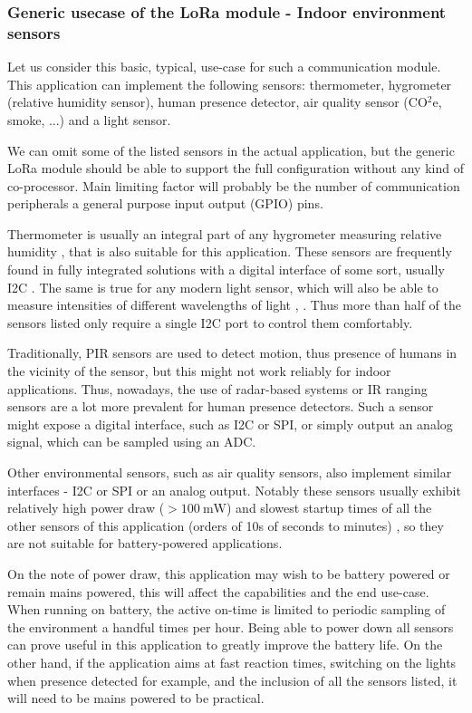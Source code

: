 \subsubsection{Generic usecase of the LoRa module - Indoor environment sensors}
Let us consider this basic, typical, use-case for such a communication module. This application can implement the following sensors: thermometer, hygrometer (relative humidity sensor), human presence detector, air quality sensor (CO$^2$e, smoke, ...) and a light sensor.

We can omit some of the listed sensors in the actual application, but the generic LoRa module should be able to support the full configuration without any kind of co-processor. Main limiting factor will probably be the number of communication peripherals a general purpose input output (GPIO) pins.

Thermometer is usually an integral part of any hygrometer measuring relative humidity \cite{webster_humidity_1998}, that is also suitable for this application. These sensors are frequently found in fully integrated solutions with a digital interface of some sort, usually I2C \cite{bosch_sensortec_gmbh_bst-bme280-ds002pdf_2024}. The same is true for any modern light sensor, which will also be able to measure intensities of different wavelengths of light \cite{stmicroelectronics_ambient_2024}, \cite{texas_instruments_inc_light_2024}. Thus more than half of the sensors listed only require a single I2C port to control them comfortably.

Traditionally, PIR sensors are used to detect motion, thus presence of humans in the vicinity of the sensor, but this might not work reliably for indoor applications. Thus, nowadays, the use of radar-based systems \cite{infineon_technologies_presence_2024} or IR ranging sensors \cite{stmicroelectronics_human_2024} are a lot more prevalent for human presence detectors. Such a sensor might expose a digital interface, such as I2C or SPI, or simply output an analog signal, which can be sampled using an ADC.

Other environmental sensors, such as air quality sensors, also implement similar interfaces - I2C or SPI or an analog output. Notably these sensors usually exhibit relatively high power draw ($>100~\mathrm{mW}$) and slowest startup times of all the other sensors of this application (orders of 10s of seconds to minutes) \cite{amphenol_inc_mics-vz-89te_2024}, so they are not suitable for battery-powered applications.

On the note of power draw, this application may wish to be battery powered or remain mains powered, this will affect the capabilities and the end use-case. When running on battery, the active on-time is limited to periodic sampling of the environment a handful times per hour. Being able to power down all sensors can prove useful in this application to greatly improve the battery life. On the other hand, if the application aims at fast reaction times, switching on the lights when presence detected for example, and the inclusion of all the sensors listed, it will need to be mains powered to be practical.

